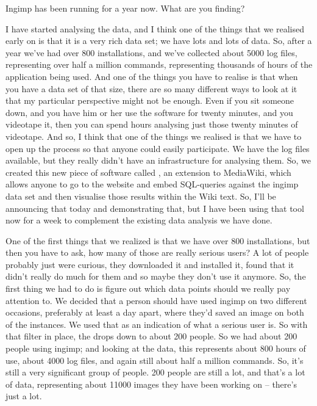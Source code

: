 { Ingimp has been running for a year now. What are you finding?\par

 I have started analysing the data, and I think one of the things
that we realised early on is that it is a very rich data set; we have
lots and lots of data. So, after a year we've had over 800
installations, and we've collected about 5000 log files, representing
over half a million commands, representing thousands of hours of the
application being used. And one of the things you have to realise is
that when you have a data set of that size, there are so many different
ways to look at it that my particular perspective might not be enough.
Even if you sit someone down, and you have him or her use the software
for twenty minutes, and you videotape it, then you can spend hours
analysing just those twenty minutes of videotape. And so, I think that
one of the things we realised is that we have to open up the process so
that anyone could easily participate. We have the log files available,
but they really didn't have an infrastructure for analysing them. So,
we created this new piece of software called , an extension
to MediaWiki, which allows anyone to go to the website and embed
SQL{}-queries against the ingimp data set and then visualise those
results within the Wiki text. So, I'll be announcing that today and
demonstrating that, but I have been using that tool now for a week to
complement the existing data analysis we have done.\par

One of the first things that we realized is that we have over 800
installations, but then you have to ask, how many of those are really
serious users? A lot of people probably just were curious, they
downloaded it and installed it, found that it didn't really do much for
them and so maybe they don't use it anymore. So, the
first thing we had to do is figure out which data points should we
really pay attention to. We decided that a person should have used
ingimp on two different occasions, preferably at least a day apart,
where they'd saved an image on both of the instances. We used that as
an indication of what a serious user is. So with that filter in place,
the  drops down to about 200 people. So we had about
200 people using ingimp; and looking at the data, this represents about
800 hours of use, about 4000 log files, and again still about half a
million commands. So, it's still a very significant group of people.
200 people are still a lot, and that's a lot of data, representing
about 11000 images they have been working on {--}
there's just a lot.\par

}

